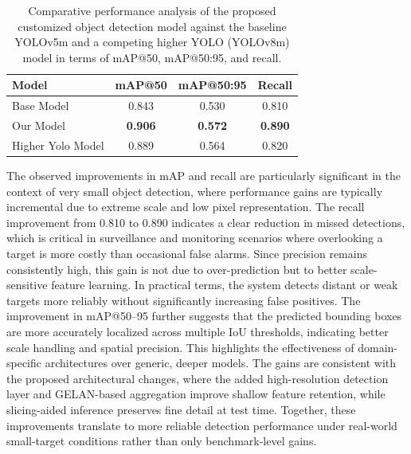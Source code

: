 \documentclass[preprint,review,12pt]{elsarticle}
\begin{document}
\begin{table}[h!]
\centering
\begin{tabular}{|l|c|c|c|}
\hline
\textbf{Model}  & \textbf{mAP@50} & \textbf{mAP@50:95} & \textbf{Recall} \\
\hline
Base Model & 0.843 & 0.530 & 0.810 \\
Our Model & \textbf{0.906} & \textbf{0.572} & \textbf{0.890} \\
Higher Yolo Model & 0.889 & 0.564 & 0.820 \\
\hline
\end{tabular}
\vspace{0.2cm}
\caption{Comparative performance analysis of the proposed customized object detection model against the baseline YOLOv5m and a competing higher YOLO (YOLOv8m) model in terms of mAP@50, mAP@50:95, and recall.}
\label{tab:model_comparison}
\end{table}

The observed improvements in mAP and recall are particularly significant in the context of very small object detection, where performance gains are typically incremental due to extreme scale and low pixel representation. The recall improvement from 0.810 to 0.890 indicates a clear reduction in missed detections, which is critical in surveillance and monitoring scenarios where overlooking a target is more costly than occasional false alarms. Since precision remains consistently high, this gain is not due to over-prediction but to better scale-sensitive feature learning. In practical terms, the system detects distant or weak targets more reliably without significantly increasing false positives. The improvement in mAP@50–95 further suggests that the predicted bounding boxes are more accurately localized across multiple IoU thresholds, indicating better scale handling and spatial precision. This highlights the effectiveness of domain-specific architectures over generic, deeper models. The gains are consistent with the proposed architectural changes, where the added high-resolution detection layer and GELAN-based aggregation improve shallow feature retention, while slicing-aided inference preserves fine detail at test time. Together, these improvements translate to more reliable detection performance under real-world small-target conditions rather than only benchmark-level gains.
\end{document}

